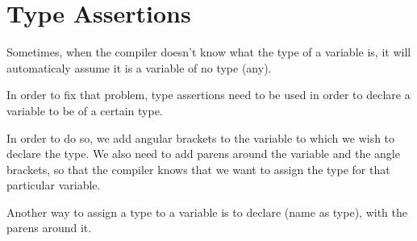 \chapter{Type Assertions}
Sometimes, when the compiler doesn't know what the type of a variable is, it will automaticaly assume it is a variable of no type (any).

In order to fix that problem, type assertions need to be used in order to declare a variable to be of a certain type.

In order to do so, we add angular brackets to the variable to which we wish to declare the type. We also need to add parens around the variable and the angle brackets, so that the compiler knows that we want to assign the type for that particular variable.

Another way to assign a type to a variable is to declare (name as type), with the parens around it.